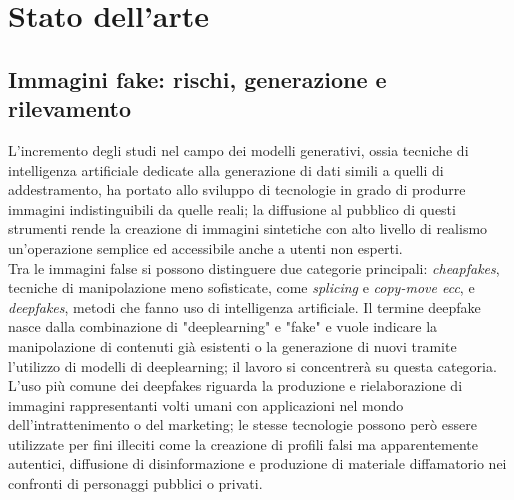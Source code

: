 \chapter{Stato dell'arte}\label{ch:theory}
\section{Immagini fake: rischi, generazione e rilevamento}\label{sec:fakeimg}
L'incremento degli studi nel campo dei modelli generativi, ossia tecniche di intelligenza artificiale dedicate alla generazione di dati simili a quelli di addestramento, ha portato allo sviluppo di tecnologie in grado di produrre immagini indistinguibili da quelle reali; la diffusione al pubblico di questi strumenti rende la creazione di immagini sintetiche con alto livello di realismo un'operazione semplice ed accessibile anche a utenti non esperti.\\ 
Tra le immagini false si possono distinguere due categorie principali: \textit{cheapfakes}, tecniche di manipolazione meno sofisticate, come \textit{splicing} e \textit{copy-move ecc}, e  \textit{deepfakes}, metodi che fanno uso di intelligenza artificiale. 
Il termine deepfake nasce dalla combinazione di "deeplearning" e "fake" e vuole indicare la manipolazione di contenuti già esistenti o la generazione di nuovi tramite l'utilizzo di modelli di deeplearning; il lavoro si concentrerà su questa categoria.
L'uso più comune dei deepfakes riguarda la produzione e rielaborazione di immagini rappresentanti volti umani con applicazioni nel mondo dell'intrattenimento o del marketing; le stesse tecnologie possono però essere utilizzate per fini illeciti come la creazione di profili falsi ma apparentemente autentici, diffusione di disinformazione e produzione di materiale diffamatorio nei confronti di personaggi pubblici o privati.
